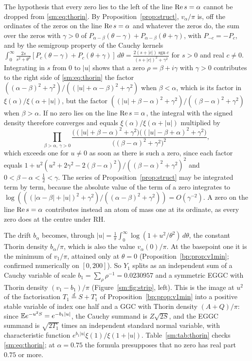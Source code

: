 The hypothesis that every zero lies to the left of the line $\operatorname{Re} s=\alpha$ cannot be dropped from \eqref{sm:eq:thorin}. By Proposition~\ref{prop:struct}, $v_\alpha/\pi$ is, off the ordinates of the zeros on the line $\operatorname{Re} s=\alpha$ and whatever the zeros do, the sum over the zeros with $\gamma>0$ of $P_{\alpha-\beta}(\theta-\gamma)+P_{\alpha-\beta}(\theta+\gamma)$, with $P_{-c}=-P_c$, and by the semigroup property of the Cauchy kernels $\int_0^\infty\frac{2s}{s^2+\theta^2}[P_c(\theta-\gamma)+P_c(\theta+\gamma)]\,d\theta=\frac{2(s+|c|)\operatorname{sgn}c}{(s+|c|)^2+\gamma^2}$ for $s>0$ and real $c\ne0$. Integrating in $s$ from $0$ to $|u|$ shows that a zero $\rho=\beta+i\gamma$ with $\gamma>0$ contributes to the right side of \eqref{sm:eq:thorin} the factor $((\alpha-\beta)^2+\gamma^2)/((|u|+\alpha-\beta)^2+\gamma^2)$ when $\beta<\alpha$, which is its factor in $\xi(\alpha)/\xi(\alpha+|u|)$, but the factor $((|u|+\beta-\alpha)^2+\gamma^2)/((\beta-\alpha)^2+\gamma^2)$ when $\beta>\alpha$. If no zero lies on the line $\operatorname{Re} s=\alpha$, the integral with the signed density therefore converges and equals $\xi(\alpha)/\xi(\alpha+|u|)$ multiplied by
\[
\prod_{\beta>\alpha,\ \gamma>0}\frac{\big((|u|+\beta-\alpha)^2+\gamma^2\big)\big((|u|-\beta+\alpha)^2+\gamma^2\big)}{\big((\beta-\alpha)^2+\gamma^2\big)^2},
\]
which exceeds one for $u\ne0$ as soon as there is such a zero, since each factor equals $1+u^2(u^2+2\gamma^2-2(\beta-\alpha)^2)/((\beta-\alpha)^2+\gamma^2)^2$ and $0<\beta-\alpha<\frac12<\gamma$. The series of Proposition~\ref{prop:struct} may be integrated term by term, because the absolute value of the term of a zero integrates to $\log(((|\alpha-\beta|+|u|)^2+\gamma^2)/((\alpha-\beta)^2+\gamma^2))=O(\gamma^{-2})$. A zero on the line $\operatorname{Re} s=\alpha$ contributes instead an atom of mass one at its ordinate, as every zero does at the centre under RH.

The drift $b_\alpha$ becomes, through $|u|=\frac1\pi\int_0^\infty\log(1+u^2/\theta^2)\,d\theta$, the constant Thorin density $b_\alpha/\pi$, which is also the value $v_\alpha(0)/\pi$. At the basepoint one it is the minimum of $v_1/\pi$, attained only at $\theta=0$ (Proposition~\ref{bp:prop:v1min}; confirmed numerically on $[0,200]$). So $Y_1$ splits as an independent sum of a Cauchy variable of scale $b_1=\sum_\rho\rho^{-1}=0.0230957$ and a symmetric EGGC with Thorin density $(v_1-b_1)/\pi$ (Figure~\ref{sm:fig:strip}, left). This is the image at $u^2$ of the factorisation $T_1\stackrel d=S+T_1^\circ$ of Proposition~\ref{bp:prop:v1min} into a positive stable variable of index one half and a GGC with Thorin density $(A+Q)/\pi$: since $\mathbb{E} e^{-u^2S}=e^{-b_1|u|}$, the Cauchy summand is $Z\sqrt{2S}$, and the EGGC summand is $\sqrt{2T_1^\circ}$ times an independent standard normal variable, with characteristic function $e^{b_1|u|}\xi(1)/\xi(1+|u|)$. Table~\ref{sm:tab:thorin} checks \eqref{sm:eq:thorin}; at $\alpha=0.75$ the formula presupposes that no zero has real part $0.75$ or more.

